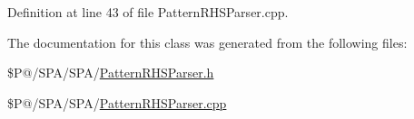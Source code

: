 Definition at line 43 of file Pattern\-R\-H\-S\-Parser.\-cpp.



The documentation for this class was generated from the following files\-:\begin{DoxyCompactItemize}
\item 
\$\-P@/\-S\-P\-A/\-S\-P\-A/\hyperlink{_pattern_r_h_s_parser_8h}{Pattern\-R\-H\-S\-Parser.\-h}\item 
\$\-P@/\-S\-P\-A/\-S\-P\-A/\hyperlink{_pattern_r_h_s_parser_8cpp}{Pattern\-R\-H\-S\-Parser.\-cpp}\end{DoxyCompactItemize}
